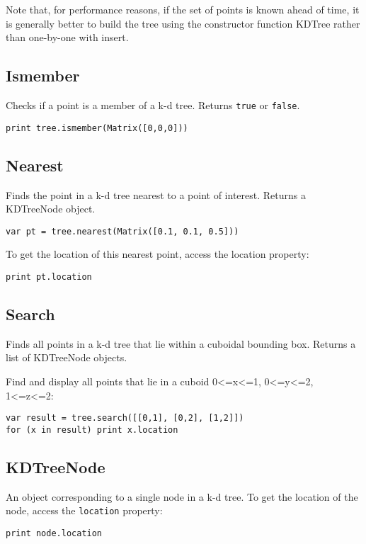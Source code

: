 Note that, for performance reasons, if the set of points is known ahead
of time, it is generally better to build the tree using the constructor
function KDTree rather than one-by-one with insert.

\hypertarget{ismember}{%
\subsection{Ismember}\label{ismember}}

Checks if a point is a member of a k-d tree. Returns \texttt{true} or
\texttt{false}.

\begin{lstlisting}
print tree.ismember(Matrix([0,0,0]))
\end{lstlisting}

\hypertarget{nearest}{%
\subsection{Nearest}\label{nearest}}

Finds the point in a k-d tree nearest to a point of interest. Returns a
KDTreeNode object.

\begin{lstlisting}
var pt = tree.nearest(Matrix([0.1, 0.1, 0.5]))
\end{lstlisting}

To get the location of this nearest point, access the location property:

\begin{lstlisting}
print pt.location
\end{lstlisting}

\hypertarget{search}{%
\subsection{Search}\label{search}}

Finds all points in a k-d tree that lie within a cuboidal bounding box.
Returns a list of KDTreeNode objects.

Find and display all points that lie in a cuboid
0\textless=x\textless=1, 0\textless=y\textless=2,
1\textless=z\textless=2:

\begin{lstlisting}
var result = tree.search([[0,1], [0,2], [1,2]])
for (x in result) print x.location
\end{lstlisting}

\hypertarget{kdtreenode}{%
\subsection{KDTreeNode}\label{kdtreenode}}

An object corresponding to a single node in a k-d tree. To get the
location of the node, access the \texttt{location} property:

\begin{lstlisting}
print node.location
\end{lstlisting}
